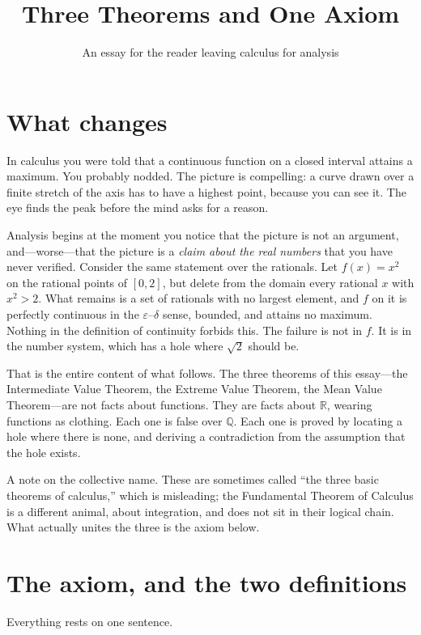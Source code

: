 \documentclass{essay}
\title{Three Theorems and One Axiom}
\author{An essay for the reader leaving calculus for analysis}
\date{}
\begin{document}
\maketitle

\section{What changes}

In calculus you were told that a continuous function on a closed interval attains a maximum. You probably nodded. The picture is compelling: a curve drawn over a finite stretch of the axis has to have a highest point, because you can see it. The eye finds the peak before the mind asks for a reason.

Analysis begins at the moment you notice that the picture is not an argument, and---worse---that the picture is a \emph{claim about the real numbers} that you have never verified. Consider the same statement over the rationals. Let \(f(x) = x^{2}\) on the rational points of \([0,2]\), but delete from the domain every rational \(x\) with \(x^{2} > 2\). What remains is a set of rationals with no largest element, and \(f\) on it is perfectly continuous in the \(\varepsilon\)--\(\delta\) sense, bounded, and attains no maximum. Nothing in the definition of continuity forbids this. The failure is not in \(f\). It is in the number system, which has a hole where \(\sqrt{2}\) should be.

That is the entire content of what follows. The three theorems of this essay---the Intermediate Value Theorem, the Extreme Value Theorem, the Mean Value Theorem---are not facts about functions. They are facts about \(\mathbb{R}\), wearing functions as clothing. Each one is false over \(\mathbb{Q}\). Each one is proved by locating a hole where there is none, and deriving a contradiction from the assumption that the hole exists.

A note on the collective name. These are sometimes called ``the three basic theorems of calculus,'' which is misleading; the Fundamental Theorem of Calculus is a different animal, about integration, and does not sit in their logical chain. What actually unites the three is the axiom below.

\section{The axiom, and the two definitions}

Everything rests on one sentence.
\end{document}
